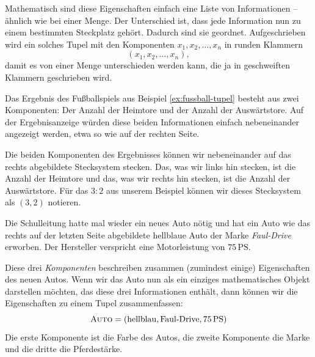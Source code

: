 \documentclass[../../main.tex]{subfiles}
\begin{document}
Mathematisch sind diese Eigenschaften einfach eine Liste von Informationen -- ähnlich wie bei einer Menge. Der Unterschied ist, dass jede Information nun zu einem bestimmten Steckplatz gehört. Dadurch sind sie geordnet. Aufgeschrieben wird ein solches Tupel mit den Komponenten $x_1,x_2,\dots,x_n$ in runden Klammern
\[(x_1,x_2,\dots,x_n),\]
damit es von einer Menge unterschieden werden kann, die ja in geschweiften Klammern geschrieben wird.

\begin{example}{}
    Das Ergebnis des Fußballspiels aus Beispiel \ref{ex:fussball-tupel} besteht aus zwei Komponenten: Der Anzahl der Heimtore und der Anzahl der Auswärtstore. Auf der Ergebnisanzeige würden diese beiden Informationen einfach nebeneinander angezeigt werden, etwa so wie auf der rechten Seite. 
    
    Die beiden Komponenten des Ergebnisses können wir nebeneinander auf das rechts abgebildete Stecksystem stecken. Das, was wir links hin stecken, ist die Anzahl der Heimtore und das, was wir rechts hin stecken, ist die Anzahl der Auswärtstore. Für das $3:2$ aus unserem Beispiel können wir dieses Stecksystem als $(3,2)$ notieren.
\end{example}

\begin{example}{}
    Die Schulleitung hatte mal wieder ein neues Auto nötig und hat ein Auto wie das rechts auf der letzten Seite abgebildete hellblaue Auto der Marke \emph{Faul-Drive} erworben. Der Hersteller verspricht eine Motorleistung von $75\,\text{PS}$.

    Diese drei \emph{Komponenten} beschreiben zusammen (zumindest einige) Eigenschaften des neuen Autos. Wenn wir das Auto nun als ein einziges mathematisches Objekt darstellen möchten, das diese drei Informationen enthält, dann können wir die Eigenschaften zu einem Tupel zusammenfassen:
    \[\textsc{Auto}=(\text{hellblau}, \text{Faul-Drive}, 75\,\text{PS})\]
    Die erste Komponente ist die Farbe des Autos, die zweite Komponente die Marke und die dritte die Pferdestärke.
\end{example}
\end{document}
